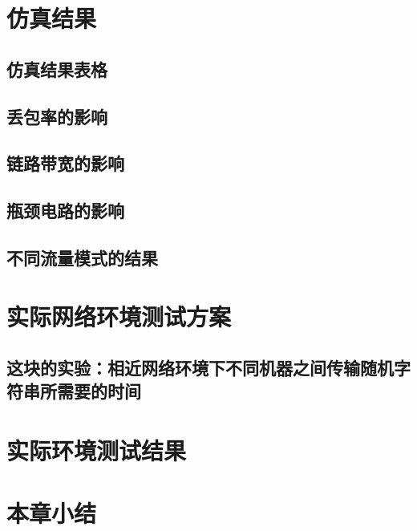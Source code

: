 \section{仿真结果}
\subsection{仿真结果表格}
\subsection{丢包率的影响}
\subsection{链路带宽的影响}
\subsection{瓶颈电路的影响}
\subsection{不同流量模式的结果}
\section{实际网络环境测试方案}
\subsection{这块的实验：相近网络环境下不同机器之间传输随机字符串所需要的时间}
\section{实际环境测试结果}
\section{本章小结}



